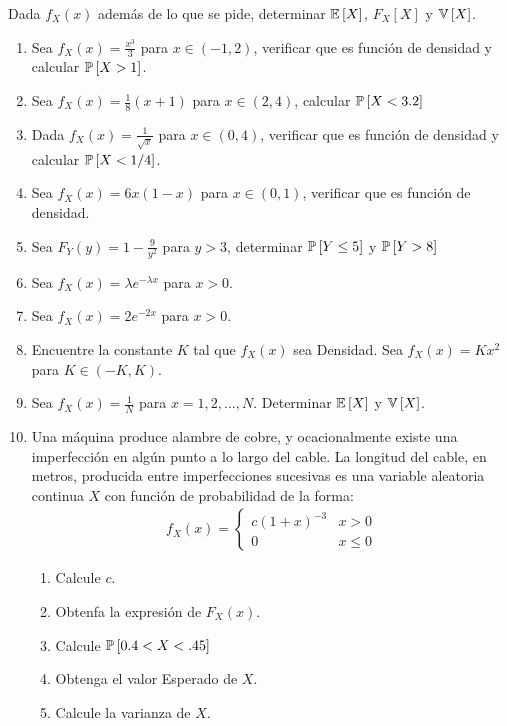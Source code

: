 \begin{Ejer}
Dada $f_{X}\left(x\right)$ además de lo que se pide, determinar $\mathbb{E}\left[X\right]$, $F_{X}\left[X\right]$ y $\mathbb{V}\left[X\right]$.


\begin{enumerate}

\item Sea $f_{X}\left(x\right)=\frac{x^{3}}{3}$ para $x\in\left(-1,2\right)$, verificar que es función de densidad y calcular $\mathbb{P}\left[X>1\right]$.

\item Sea $f_{X}\left(x\right)=\frac{1}{8}\left(x+1\right)$ para $x\in(2,4)$, calcular $\mathbb{P}\left[X<3.2\right]$

\item Dada $f_{X}\left(x\right)=\frac{1}{\sqrt{x}}$ para $x\in\left(0,4\right)$, verificar que es función de densidad y calcular $\mathbb{P}\left[X<1/4\right]$.

\item Sea $f_{X}\left(x\right)=6x\left(1-x\right)$ para $x\in\left(0,1\right)$, verificar que es función de densidad.

\item Sea $F_{Y}\left(y\right)=1-\frac{9}{y^{2}}$ para $y>3$, determinar $\mathbb{P}\left[Y\leq 5\right]$ y $\mathbb{P}\left[Y>8\right]$

\item Sea $f_{X}\left(x\right)=\lambda e^{-\lambda x}$ para $x>0$.

\item Sea $f_{X}\left(x\right)=2e^{-2x}$ para $x>0$.

\item Encuentre la constante $K$ tal que $f_{X}\left(x\right)$ sea Densidad. Sea $f_{X}\left(x\right)=Kx^{2}$ para $K\in\left(-K,K\right)$.

\item Sea $f_{X}\left(x\right)=\frac{1}{N}$ para $x=1,2,\ldots,N$. Determinar $\mathbb{E}\left[X\right]$ y $\mathbb{V}\left[X\right]$.

\item Una máquina produce alambre de cobre, y ocacionalmente existe una imperfección en algún punto a lo largo del cable. La longitud del cable, en metros, producida entre imperfecciones sucesivas es una variable aleatoria continua $X$ con función de probabilidad de la forma:
\begin{eqnarray*}
f_{X}\left(x\right)= \left\{ \begin{array}{ll}
c\left(1+x\right)^{-3} & x>0\\
0 & x\leq0
\end{array} \right.
\end{eqnarray*}
\begin{enumerate}
\item Calcule $c$.
\item Obtenfa la expresión de $F_{X}\left(x\right)$.
\item Calcule  $\mathbb{P}\left[0.4<X<.45\right]$
\item Obtenga el valor Esperado de $X$.
\item Calcule la varianza de $X$.
\end{enumerate}


\end{enumerate}
\end{Ejer}
